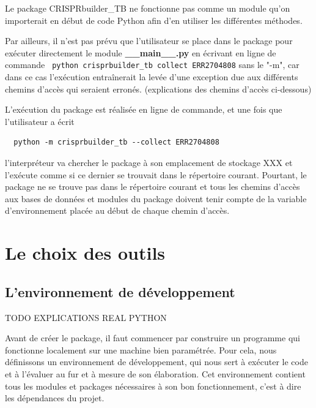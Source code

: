 \documentclass[twoside,a4paper,11pt,frenchb,openany]{report}
\begin{document}
Le package CRISPRbuilder\_TB ne fonctionne pas comme un module qu'on importerait en début de code Python afin d'en utiliser les différentes méthodes.

Par ailleurs, il n'est pas prévu que l'utilisateur se place dans le package pour exécuter directement le module \textbf{\_\_main\_\_.py} en écrivant en ligne de commande
\texttt{ python crisprbuilder\_tb \textemdash \textemdash collect ERR2704808}
sans le "-m", car dans ce cas l'exécution entraînerait la levée d'une exception due aux différents chemins d'accès qui seraient erronés. (explications des chemins d'accès ci-dessous)

L'exécution du package est réalisée en ligne de commande, et une fois que l'utilisateur a écrit 
\begin{verbatim}  python -m crisprbuilder_tb --collect ERR2704808\end{verbatim}

l'interpréteur va chercher le package à son emplacement de stockage XXX et l'exécute comme si ce dernier se trouvait dans le répertoire courant. Pourtant, le package ne se trouve pas dans le répertoire courant et tous les chemins d'accès aux bases de données et modules du package doivent tenir compte de la variable d'environnement placée au début de chaque chemin d'accès.



\chapter{Le choix des outils}




\section{L'environnement de développement}

TODO EXPLICATIONS REAL PYTHON

Avant de créer le package, il faut commencer par construire un programme qui fonctionne localement sur une machine bien paramétrée. Pour cela, nous définissons un environnement de développement, qui nous sert à exécuter le code et à l'évaluer au fur et à mesure de son élaboration. Cet environnement contient tous les modules et packages nécessaires à son bon fonctionnement, c'est à dire les dépendances du projet.
 
\end{document}
